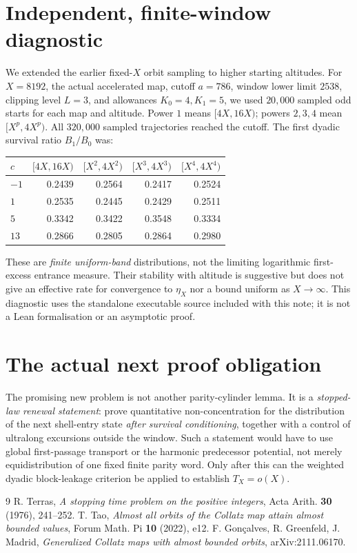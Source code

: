 \documentclass[11pt,a4paper]{article}
\theoremstyle{remark}
\begin{document}
\section{Independent, finite-window diagnostic}
We extended the earlier fixed-$X$ orbit sampling to higher starting
altitudes.  For $X=8192$, the actual accelerated map, cutoff $a=786$,
window lower limit $2538$, clipping level $L=3$, and allowances
$K_0=4,K_1=5$, we used $20{,}000$ sampled odd starts for each map and
altitude.  Power $1$ means $[4X,16X)$; powers $2,3,4$ mean
$[X^p,4X^p)$.  All $320{,}000$ sampled trajectories reached the
cutoff.  The first dyadic survival ratio $B_1/B_0$ was:
\begin{center}
\begin{tabular}{@{}lrrrr@{}}
\toprule
$c$ & $[4X,16X)$ & $[X^2,4X^2)$ & $[X^3,4X^3)$ & $[X^4,4X^4)$\\
\midrule
$-1$ & 0.2439 & 0.2564 & 0.2417 & 0.2524\\
$1$ & 0.2535 & 0.2445 & 0.2429 & 0.2511\\
$5$ & 0.3342 & 0.3422 & 0.3548 & 0.3334\\
$13$ & 0.2866 & 0.2805 & 0.2864 & 0.2980\\
\bottomrule
\end{tabular}
\end{center}
These are \emph{finite uniform-band} distributions, not the limiting
logarithmic first-excess entrance measure.  Their stability with
altitude is suggestive but does not give an effective rate for
convergence to $\eta_X$ nor a bound uniform as $X\to\infty$.
This diagnostic uses the standalone executable source included with
this note; it is not a Lean formalisation or an asymptotic proof.

\section{The actual next proof obligation}
The promising new problem is not another parity-cylinder lemma.  It
is a \emph{stopped-law renewal statement}: prove quantitative
non-concentration for the distribution of the next shell-entry state
\emph{after survival conditioning}, together with a control of
ultralong excursions outside the window.  Such a statement would
have to use global first-passage transport or the harmonic predecessor
potential, not merely equidistribution of one fixed finite parity word.
Only after this can the weighted dyadic block-leakage
criterion be applied to establish $T_X=o(X)$.

\begin{thebibliography}{9}
 R. Terras,
\emph{A stopping time problem on the positive integers},
Acta Arith. \textbf{30} (1976), 241--252.
 T. Tao,
\emph{Almost all orbits of the Collatz map attain almost bounded values},
Forum Math. Pi \textbf{10} (2022), e12.
 F. Gon\c{c}alves, R. Greenfeld, J. Madrid,
\emph{Generalized Collatz maps with almost bounded orbits},
arXiv:2111.06170.
\end{thebibliography}
\end{document}

